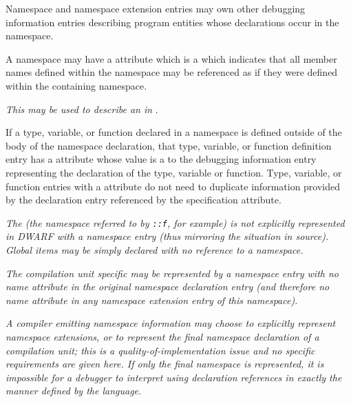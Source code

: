 Namespace and namespace extension entries may own 
other
debugging information entries describing program entities
whose declarations occur in the namespace.

A namespace may have a 
\DWATexportsymbolsDEFN{}
attribute
which is a \CLASSflag{} which
indicates that all member names defined within the 
namespace may be referenced as if they were defined within 
the containing namespace. 

\textit{This may be used to describe an  in }.

If a type, variable, or function declared in a namespace is
defined outside of the body of the namespace declaration,
that type, variable, or function definition entry has a
\DWATspecification{} attribute 
whose value is a  to the
debugging information entry representing the declaration of
the type, variable or function. Type, variable, or function
entries with a 
\DWATspecification{} attribute 
do not need
to duplicate information provided by the declaration entry
referenced by the specification attribute.

\textit{The  
(the 
namespace 
referred to by
\texttt{::f}, for example) is not explicitly represented in
DWARF with a namespace entry (thus mirroring the situation
in  source).  
Global items may be simply declared with no
reference to a namespace.}

\textit{The  
compilation unit specific  may
be represented by a namespace entry with no name attribute in
the original namespace declaration entry (and therefore no name
attribute in any namespace extension entry of this namespace).
}

\textit{A compiler emitting namespace information may choose to
explicitly represent namespace extensions, or to represent the
final namespace declaration of a compilation unit; this is a
quality-of-implementation issue and no specific requirements
are given here. If only the final namespace is represented,
it is impossible for a debugger to interpret using declaration
references in exactly the manner defined by the 
 language.}

